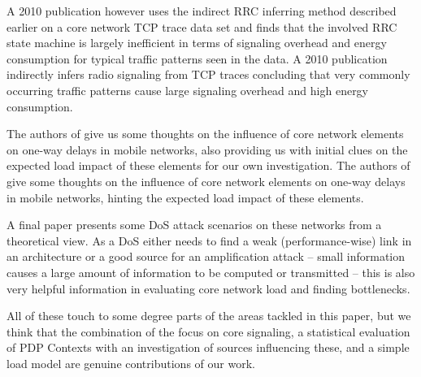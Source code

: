 A 2010 publication\cite{Qian:2010:CRR:1879141.1879159} however uses the indirect \gls{RRC} inferring method described earlier on a core network TCP trace data set and finds that the involved \gls{RRC} state machine is largely inefficient in terms of signaling overhead and energy consumption for typical traffic patterns seen in the data.
A 2010 publication \cite{Qian:2010:CRR:1879141.1879159} indirectly infers radio signaling from TCP traces concluding that very commonly occurring traffic patterns cause large signaling overhead and high energy consumption.

The authors of \cite{4675847} give us some thoughts on the influence of core network elements on one-way delays in mobile networks, also providing us with initial clues on the expected load impact of these elements for our own investigation.
The authors of \cite{4675847} give some thoughts on the influence of core network elements on one-way delays in mobile networks, hinting the expected load impact of these elements.

A final paper \cite{Ricciato2010551} presents some \gls{DoS} attack scenarios on these networks from a theoretical view. As a \gls{DoS} either needs to find a weak (performance-wise) link in an architecture or a good source for an amplification attack -- small information causes a large amount of information to be computed or transmitted -- this is also very helpful information in evaluating core network load and finding bottlenecks.

All of these touch to some degree parts of the areas tackled in this paper, but we think that the combination of the focus on core signaling, a statistical evaluation of PDP Contexts with an investigation of sources influencing these, and a simple load model are genuine contributions of our work.





